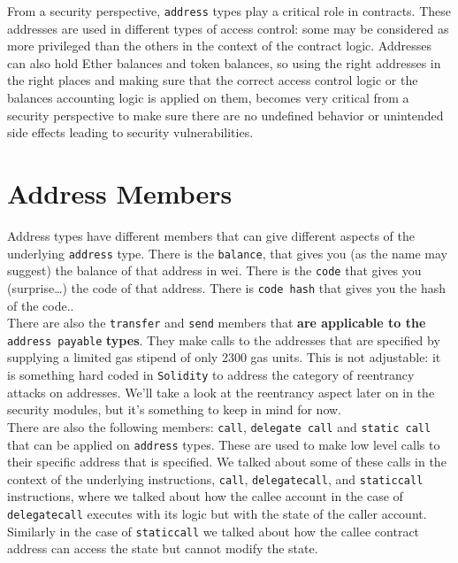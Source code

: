 From a security perspective, \texttt{address} types play a critical role in contracts. These addresses are used in different types of access control: some may be considered as more privileged than the others in the context of the contract logic. Addresses can also hold Ether balances and token balances, so using the right addresses in the right places and making sure that the correct access control logic or the balances accounting logic is applied on them, becomes very critical from a security perspective to make sure there are no undefined behavior or unintended side effects leading to security vulnerabilities.\\

\section{Address Members}
Address types have different members that can give different aspects of the underlying \texttt{address} type. There is the \texttt{balance}, that gives you (as the name may suggest) the balance of that address in wei. There is the \texttt{code} that gives you (surprise\dots) the code of that address. There is \texttt{code hash} that gives you the hash of the code..\\

There are also the \texttt{transfer} and \texttt{send} members that \textbf{are applicable to the} \texttt{address payable} \textbf{types}. They make calls to the addresses that are specified by supplying a limited gas stipend of only 2300 gas units. This is not adjustable: it is something hard coded in \texttt{Solidity} to address the category of reentrancy attacks on addresses. We'll take a look at the reentrancy aspect later on in the security modules, but it's something to keep in mind for now.\\

There are also the following members: \texttt{call}, \texttt{delegate call} and \texttt{static call} that can be applied on \texttt{address} types. These are used to make low level calls to their specific address that is specified. We talked about some of these calls in the context of the underlying instructions, \texttt{call}, \texttt{delegatecall}, and \texttt{staticcall} instructions, where we talked about how the callee account in the case of \texttt{delegatecall} executes with its logic but with the state of the caller account. Similarly in the case of \texttt{staticcall} we talked about how the callee contract address can access the state but cannot modify the state.\\

